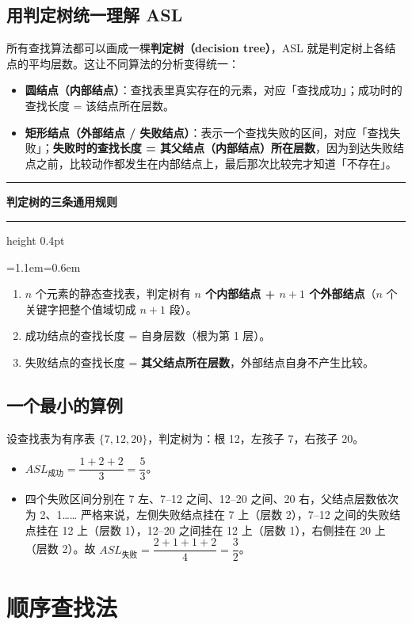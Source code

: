 \documentclass[11pt,openany,UTF8]{ctexbook}
\newcommand{\callouthead}[2]{%
  \par\addvspace{7pt}\noindent
  {\color{#1}\rule[-0.15em]{3pt}{1.05em}}\hspace{0.5em}%
  {\bfseries\color{#1}#2}\par\nobreak\vspace{-0.35em}%
  {\color{rulesep}\hrule height 0.4pt}\nobreak\vspace{0.45em}%
  \begingroup\small\setlength{\parindent}{0pt}%
  \leftskip=1.1em\rightskip=0.6em\noindent\ignorespaces}
\newcommand{\calloutend}{\par\endgroup\addvspace{7pt}}
\newenvironment{callkey}[1]{\callouthead{keybar}{#1}}{\calloutend}
\begin{document}
\subsection{用判定树统一理解 ASL}

所有查找算法都可以画成一棵\textbf{判定树（decision tree）}，ASL 就是判定树上各结点的平均层数。这让不同算法的分析变得统一：

\begin{itemize}
\item \textbf{圆结点（内部结点）}：查找表里真实存在的元素，对应「查找成功」；成功时的查找长度 = 该结点所在层数。
\item \textbf{矩形结点（外部结点 / 失败结点）}：表示一个查找失败的区间，对应「查找失败」；\textbf{失败时的查找长度 = 其父结点（内部结点）所在层数}，因为到达失败结点之前，比较动作都发生在内部结点上，最后那次比较完才知道「不存在」。
\end{itemize}
\begin{callkey}{判定树的三条通用规则}
\begin{enumerate}
\item $n$ 个元素的静态查找表，判定树有 \textbf{$n$ 个内部结点 + $n+1$ 个外部结点}（$n$ 个关键字把整个值域切成 $n+1$ 段）。
\item 成功结点的查找长度 = 自身层数（根为第 1 层）。
\item 失败结点的查找长度 = \textbf{其父结点所在层数}，外部结点自身不产生比较。
\end{enumerate}
\end{callkey}

\subsection{一个最小的算例}

设查找表为有序表 $\{7, 12, 20\}$，判定树为：根 12，左孩子 7，右孩子 20。

\begin{itemize}
\item $ASL_{成功}=\dfrac{1+2+2}{3}=\dfrac{5}{3}$。
\item 四个失败区间分别在 7 左、7–12 之间、12–20 之间、20 右，父结点层数依次为 2、1…… 严格来说，左侧失败结点挂在 7 上（层数 2），7–12 之间的失败结点挂在 12 上（层数 1），12–20 之间挂在 12 上（层数 1），右侧挂在 20 上（层数 2）。故 $ASL_{失败}=\dfrac{2+1+1+2}{4}=\dfrac{3}{2}$。
\end{itemize}
\section{顺序查找法}
\end{document}

